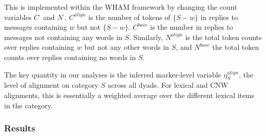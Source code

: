 \documentclass[11pt]{article}
\begin{document}
This is implemented within the WHAM framework by changing the count variables $C^\cdot$ and $N^\cdot$. $C^{align}$ is the number of tokens of $\{S-w\}$ in replies to messages containing $w$ but not $\{S - w\}$. $C^{base}$ is the number in replies to messages not containing any words in $S$.  Similarly, $N^{align}$ is the total token counts over replies containing $w$ but not any other words in $S$, and $N^{base}$ the total token counts over replies containing no words in $S$.

The key quantity in our analyses is the inferred marker-level variable $\eta^{align}_{S}$, the level of alignment on category $S$ across all dyads. For lexical and CNW alignments, this is essentially a weighted average over the different lexical items in the category.

\subsubsection{Results}
\end{document}
